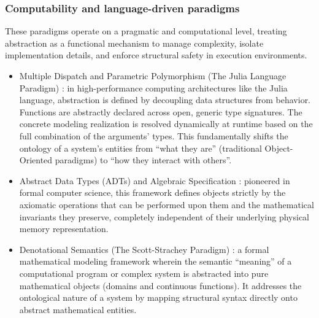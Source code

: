 \documentclass[11pt, a4paper]{article}
\begin{document}
\subsubsection*{Computability and language-driven paradigms}
These paradigms operate on a pragmatic and computational level, treating abstraction as a functional mechanism to manage complexity, isolate implementation details, and enforce structural safety in execution environments.
\begin{itemize}
	\item \textrm{Multiple Dispatch and Parametric Polymorphism (The Julia Language Paradigm) \cite{juliaparadigm}:} in high-performance computing architectures like the Julia language, abstraction is defined by decoupling data structures from behavior. Functions are abstractly declared across open, generic type signatures. The concrete modeling realization is resolved dynamically at runtime based on the full combination of the arguments' types. This fundamentally shifts the ontology of a system's entities from ``what they are'' (traditional Object-Oriented paradigms) to ``how they interact with others''.
	\item \textrm{Abstract Data Types (ADTs) and Algebraic Specification \cite{guttag_adts_algebraic}}: pioneered in formal computer science, this framework defines objects strictly by the axiomatic operations that can be performed upon them and the mathematical invariants they preserve, completely independent of their underlying physical memory representation.
	\item \textrm{Denotational Semantics (The Scott-Strachey Paradigm) \cite{stoy1977denotational}:} a formal mathematical modeling framework wherein the semantic ``meaning'' of a computational program or complex system is abstracted into pure mathematical objects (domains and continuous functions). It addresses the ontological nature of a system by mapping structural syntax directly onto abstract mathematical entities.
\end{itemize}
\end{document}
